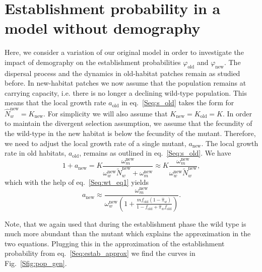 \documentclass[a4paper,11pt]{scrartcl}
\newcommand{\chg}[1]{\textcolor{change}{#1}}
\begin{document}
\newpage
\section{Establishment probability in a model without demography}
Here, we consider a variation of our original model in order to investigate the impact of demography on the establishment probabilities $\varphi_{\text{old}}$ and $\varphi_{\text{new}}$. The dispersal process and the dynamics in old-habitat patches remain as studied before. In new-habitat patches we now assume that the population remains at carrying capacity, i.e. there is no longer a declining wild-type population. This means that the local growth rate $a_{\text{old}}$ in eq.~\eqref{Seq:s_old} takes the form for $\widehat{N}_w^{\text{new}}=K_{\text{new}}$. For simplicity we will also assume that $K_{\text{new}}=K_{\text{old}}=K$. In order to maintain the divergent selection assumption, we assume that the fecundity of the wild-type in the new habitat is below the fecundity of the mutant. %
Therefore, we need to adjust the local growth rate of a single mutant, $a_{\text{new}}$. The local growth rate in old habitats, $a_{\text{old}}$, remains as outlined in eq.~\eqref{Seq:s_old}. We have
\begin{equation}
    1+a_{\text{new}} = K \frac{\omega_m^{\text{new}}}{\omega_w^{\text{new}} \widetilde{N}_w^{\text{new}}+ \omega_m^{\text{new}}}\approx K \frac{\omega_m^{\text{new}}}{\omega_w^{\text{new}} \widetilde{N}_w^{\text{new}}},
\end{equation}
which with the help of eq.~\eqref{Seq:wt_eq1} yields
\begin{equation}
    a_{\text{new}} \approx \frac{\omega_m^{\text{new}}}{\omega_w^{\text{new}}\left(1+\frac{m f_{\text{old}} (1-\widehat{\pi}_w)}{1-f_{\text{old}}+\widehat{\pi}_w f_{\text{old}}}\right)}.
\end{equation}

\chg{Note, that we again used that during the establishment phase the wild type is much more abundant than the mutant which explains the approximation in the two equations.}
Plugging this in the approximation of the establishment probability from eq.~\eqref{Seq:estab_approx} we find the curves in Fig.~\ref{Sfig:pop_gen}.
\end{document}
